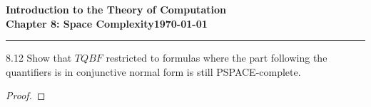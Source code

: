 \documentclass[11pt]{article}
\newcommand{\dated}{\today}
\begin{document}
\textbf{Introduction to the Theory of
Computation}\hfill\textbf{\myname}\\[0.01in]
\textbf{Chapter 8: Space Complexity}\hfill\textbf{\dated}\\
\smallskip\hrule\bigskip

\begin{problem}{8.12}
Show that $TQBF$ restricted to formulas where the part following the quantifiers is in conjunctive normal form is still PSPACE-complete.
\end{problem}

\begin{proof}


\end{proof}
\end{document}
